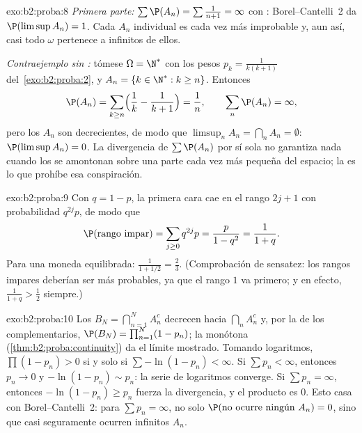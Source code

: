 \begin{solution}{exo:b2:proba:8}
\emph{Primera parte:} $\sum \P(A_n) = \sum\frac{1}{n+1} = \infty$ con
: Borel--Cantelli~2 da $\P(\limsup A_n) = 1$. Cada $A_n$
individual es cada vez más improbable y, aun así, casi todo $\omega$
pertenece a infinitos de ellos.

\emph{Contraejemplo sin :} tómese $\Omega = \N^*$ con los
pesos $p_k = \frac{1}{k(k+1)}$ del~\cref{exo:b2:proba:2}, y $A_n =
\{k \in \N^* : k \geq n\}$. Entonces
\[
\P(A_n) = \sum_{k \geq n}\Bigl(\frac1k - \frac1{k+1}\Bigr)
= \frac1n ,
\qquad
\sum_n \P(A_n) = \infty ,
\]
pero los $A_n$ son decrecientes, de modo que $\limsup_n A_n =
\bigcap_n A_n = \emptyset$: $\P(\limsup A_n) = 0$. La divergencia de
$\sum\P(A_n)$ por sí sola no garantiza nada cuando los  se
amontonan sobre una parte cada vez más pequeña del espacio; la
 es lo que prohíbe esa conspiración.
\end{solution}

\begin{solution}{exo:b2:proba:9}
Con $q = 1 - p$, la primera cara cae en el rango $2j + 1$ con
probabilidad $q^{2j}p$, de modo que
\[
\P(\text{rango impar}) = \sum_{j\geq0}q^{2j}p
= \frac{p}{1 - q^2} = \frac{1}{1 + q} .
\]
Para una moneda equilibrada: $\frac1{1 + 1/2} = \frac23$.
(Comprobación de sensatez: los rangos impares deberían ser más
probables, ya que el rango $1$ va primero; y en efecto, $\frac1{1+q}
> \frac12$ siempre.)
\end{solution}

\begin{solution}{exo:b2:proba:10}
Los  $B_N = \bigcap_{n=1}^N A_n^c$ decrecen hacia
$\bigcap_nA_n^c$ y, por la  de los complementarios,
$\P(B_N) = \prod_{n=1}^N(1 - p_n)$; la  monótona
(\cref{thm:b2:proba:continuity}) da el límite mostrado. Tomando
logaritmos, $\prod(1 - p_n) > 0$ si y solo si $\sum-\ln(1 - p_n) <
\infty$. Si $\sum p_n < \infty$, entonces $p_n \to 0$ y $-\ln(1 -
p_n) \sim p_n$: la serie de logaritmos converge. Si $\sum p_n =
\infty$, entonces $-\ln(1 - p_n) \geq p_n$ fuerza la divergencia, y
el producto es $0$. Esto casa con Borel--Cantelli~2: para $\sum p_n =
\infty$, no solo $\P(\text{no ocurre ningún }A_n) = 0$, sino que casi
seguramente ocurren infinitos $A_n$.
\end{solution}

